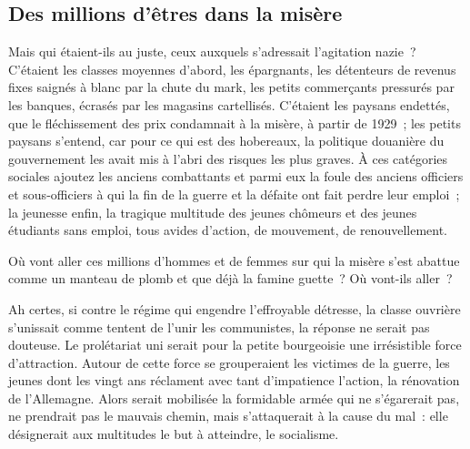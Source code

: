 \documentclass[french,twoside]{book} %
\begin{document}
\subsection[Des millions d’êtres dans la misère]{Des millions d’êtres dans la misère}
\noindent Mais qui étaient-ils au juste, ceux auxquels s’adressait l’agitation nazie ? C’étaient les classes moyennes d’abord, les épargnants, les détenteurs de revenus fixes saignés à blanc par la chute du mark, les petits commerçants pressurés par les banques, écrasés par les magasins cartellisés. C’étaient les paysans endettés, que le fléchissement des prix condamnait à la misère, à partir de 1929 ; les petits paysans s’entend, car pour ce qui est des hobereaux, la politique douanière du gouvernement les avait mis à l’abri des risques les plus graves. À ces catégories sociales ajoutez les anciens combattants et parmi eux la foule des anciens officiers et sous-officiers à qui la fin de la guerre et la défaite ont fait perdre leur emploi ; la jeunesse enfin, la tragique multitude des jeunes chômeurs et des jeunes étudiants sans emploi, tous avides d’action, de mouvement, de renouvellement.\par
Où vont aller ces millions d’hommes et de femmes sur qui la misère s’est abattue comme un manteau de plomb et que déjà la famine guette ? Où vont-ils aller ?\par
Ah certes, si contre le régime qui engendre l’effroyable détresse, la classe ouvrière s’unissait comme tentent de l’unir les communistes, la réponse ne serait pas douteuse. Le prolétariat uni serait pour la petite bourgeoisie une irrésistible force d’attraction. Autour de cette force se grouperaient les victimes de la guerre, les jeunes dont les vingt ans réclament avec tant d’impatience l’action, la rénovation de l’Allemagne. Alors serait mobilisée la formidable armée qui ne s’égarerait pas, ne prendrait pas le mauvais chemin, mais s’attaquerait à la cause du mal : elle désignerait aux multitudes le but à atteindre, le socialisme.
\end{document}
